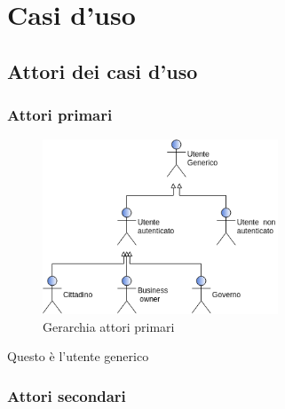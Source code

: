 \section{Casi d'uso} 
\subsection{Attori dei casi d'uso}
\subsubsection{Attori primari}
\begin{figure}[h]
	\includegraphics[width=7cm]{res/images/attori_primari.png}
	\centering
	\caption{Gerarchia attori primari}

\end{figure}
\begin{description}[style=nextline]
	\item[Utente Generico]
	Questo è l'utente generico
\end{description}
\subsubsection{Attori secondari}
 
